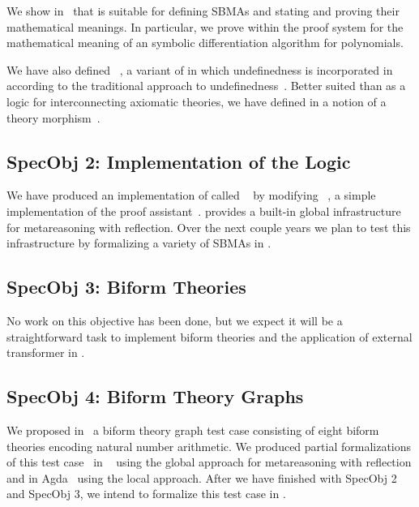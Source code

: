 \documentclass[fleqn]{llncs}
\begin{document}
We show in~\cite{Farmer18} that {\churchqe} is suitable for defining
SBMAs and stating and proving their mathematical meanings.  In
particular, we prove within the proof system for {\churchqe} the
mathematical meaning of an symbolic differentiation algorithm for
polynomials.

We have also defined {\churchuqe}~\cite{Farmer17}, a variant of
{\churchqe} in which undefinedness is incorporated in {\churchqe}
according to the traditional approach to
undefinedness~\cite{Farmer04}.  Better suited than {\churchqe} as a
logic for interconnecting axiomatic theories, we have defined in
{\churchuqe} a notion of a theory morphism~\cite{Farmer17}.

\subsection*{SpecObj 2: Implementation of the Logic}

We have produced an implementation of {\churchqe} called
{\HLQE}~\cite{CaretteFarmerLaskowski18} by modifying
{\HL}~\cite{Harrison09}, a simple implementation of the {\HOL} proof
assistant~\cite{GordonMelham93}.  {\HLQE} provides a built-in global
infrastructure for metareasoning with reflection.  Over the next
couple years we plan to test this infrastructure by formalizing a
variety of SBMAs in {\HLQE}.

\subsection*{SpecObj 3: Biform Theories}

No work on this objective has been done, but we expect it will be a
straightforward task to implement biform theories and the application
of external transformer in {\HLQE}.

\subsection*{SpecObj 4: Biform Theory Graphs}

We proposed in~\cite{CaretteFarmer17} a biform theory graph test case
consisting of eight biform theories encoding natural number
arithmetic.  We produced partial formalizations of this test
case~\cite{CaretteFarmer17} in {\churchuqe}~\cite{Farmer17} using the
global approach for metareasoning with reflection and in
Agda~\cite{Norell07,Norell09} using the local approach.  After we have
finished with SpecObj 2 and SpecObj 3, we intend to formalize this
test case in {\HLQE}.
\end{document}
